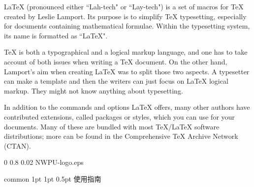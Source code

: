 \documentclass[report, twoside, UTF8, AutoFakeBold = 1, AutoFakeSlant, zihao = -4]{config}
\begin{document}
\begin{abstractEN}[-2] %

\LaTeX{} (pronounced either ``Lah-tech" or ``Lay-tech") is a set of macros for \TeX{} created by Leslie Lamport. Its purpose is to simplify \TeX{} typesetting, especially for documents containing mathematical formulae. Within the typesetting system, its name is formatted as ``\LaTeX{}".

\TeX{} is both a typographical and a logical markup language, and one has to take account of both issues when writing a \TeX{} document. On the other hand, Lamport's aim when creating \LaTeX{} was to split those two aspects. A typesetter can make a template and then the writers can just focus on \LaTeX{} logical markup. They might not know anything about typesetting.

In addition to the commands and options \LaTeX{} offers, many other authors have contributed extensions, called packages or styles, which you can use for your documents. Many of these are bundled with most \TeX{}/\LaTeX{} software distributions; more can be found in the Comprehensive \TeX{} Archive Network (CTAN).

\def\keywordsEN{keyword 1，keyword 2，keyword 3，keyword 4，keyword 5}

\end{abstractEN}




\imageWatermark %
    {0} %
    {0.8} %
    {0.02} %
    {NWPU-logo.eps} %


\Header
    {common} %
    {1pt} %
    {1pt} %
    {0.5pt} %
    {使用指南} %
    {} %
    {\currentChapterInfo} %

\end{document}
